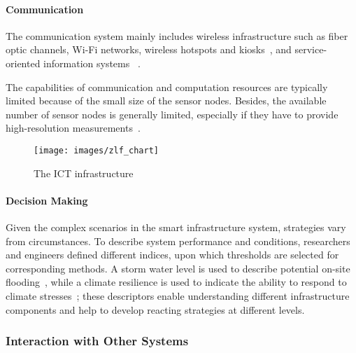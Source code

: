 \documentclass[letterpaper, twocolumn, 10pt, conference]{IEEEtran}
\begin{document}
\paragraph{Communication}

The communication system mainly includes wireless infrastructure such as fiber optic channels, Wi-Fi networks, wireless hotspots and kiosks~\cite{chourabi2012understanding}, and service-oriented information systems~	\cite{anthopoulos2010digital}. 

The capabilities of communication and computation resources are typically limited because of the small size of the sensor nodes. 
Besides, the available number of sensor nodes is generally limited, especially if they have to provide high-resolution measurements~\cite{faulkner2011next}.

\begin{figure}[h!]
        \centering
        \texttt{[image: images/zlf\_chart]}
        \caption{The ICT infrastructure}
        \label{fig:zlfchart}
\end{figure}

\paragraph{Decision Making}

Given the complex scenarios in the smart infrastructure system, strategies vary from circumstances. To describe system performance and conditions, researchers and engineers defined different indices, upon which thresholds are selected for corresponding methods. A storm water level is used to describe potential on-site flooding~\cite{Brears2018_1}, while a climate resilience is used to indicate the ability to respond to climate stresses~\cite{Brears2018_2}; these descriptors enable understanding different infrastructure components and help to develop reacting strategies at different levels.  



\subsubsection{Interaction with Other Systems}
\label{sssec:zlf:smart_infrastructure:interaction}
\end{document}
